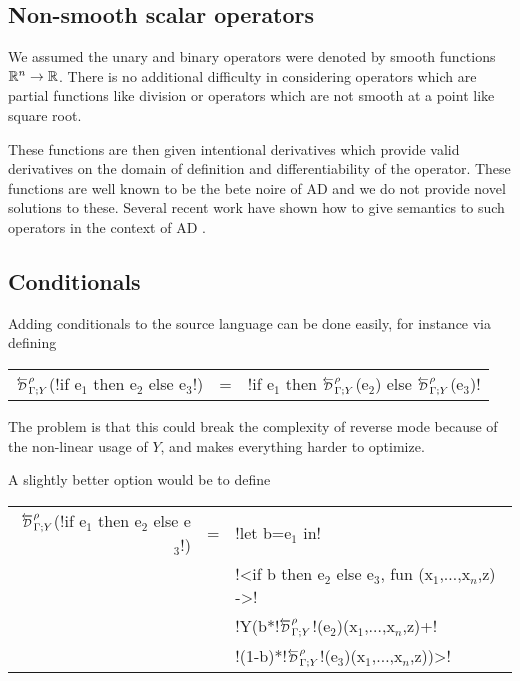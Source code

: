 \subsection{Non-smooth scalar operators} %
\label{sub:Adding more scalar operators}

We assumed the unary and binary operators were denoted by smooth functions $\mathbb{R}^n\to\mathbb{R}$. 
There is no additional difficulty in considering operators which are partial functions 
like division or operators which are not smooth at a point like square root.

These functions are then given intentional derivatives which provide valid derivatives 
on the domain of definition and differentiability of the operator. 
These functions are well known to be the bete noire of AD \cite{griewank2008evaluating} 
and we do not provide novel solutions to these.  
Several recent work have shown how to give semantics to such operators in the context of AD \cite{vakar2020denotational,mazza2021automatic,sherman2021,lee2020correctness}.

\subsection{Conditionals} %
\label{sub:Adding conditionals}

Adding conditionals to the source language can be done easily, for instance via defining

\begin{tabular}{r c l}
$\directD{\rho}{\Gamma}{Y}$(!if e$_1$ then e$_2$ else e$_3$!) &=& !if e$_1$ then $\directD{\rho}{\Gamma}{Y}$(e$_2$) else $\directD{\rho}{\Gamma}{Y}$(e$_3$)! 
\end{tabular}

The problem is that this could break the complexity of reverse mode because of the non-linear usage of $Y$, and makes everything harder to optimize.

A slightly better option would be to define 

\begin{tabular}{r c l}
    $\directD{\rho}{\Gamma}{Y}$(!if e$_1$ then e$_2$ else e$_3$!) 
    &=& !let b=e$_1$ in!   \\
    && !<if b then e$_2$ else e$_3$, fun (x$_1$,$\ldots$,x$_n$,z) ->! \\
    && !Y(b*!$\directD{\rho}{\Gamma}{Y}$!(e$_2$)(x$_1$,$\ldots$,x$_n$,z)+!\\
    && \quad!(1-b)*!$\directD{\rho}{\Gamma}{Y}$!(e$_3$)(x$_1$,$\ldots$,x$_n$,z))>!
\end{tabular}

